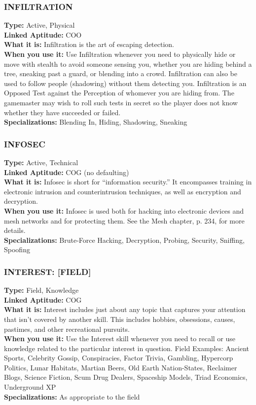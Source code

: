 \subsubsection{INFILTRATION} \textbf{Type:} Active, Physical \\ \textbf{Linked Aptitude:} COO \\ \textbf{What it is:} Infiltration is the art of escaping detection. \\ \textbf{When you use it:} Use Infiltration whenever you need to physically hide or move with stealth to avoid someone sensing you, whether you are hiding behind a tree, sneaking past a guard, or blending into a crowd. Infiltration can also be used to follow people (shadowing) without them detecting you. Infiltration is an Opposed Test against the Perception of whomever you are hiding from. The gamemaster may wish to roll such tests in secret so the player does not know whether they have succeeded or failed. \\ \textbf{Specializations:} Blending In, Hiding, Shadowing, Sneaking 

\subsubsection{INFOSEC} \textbf{Type:} Active, Technical \\ \textbf{Linked Aptitude:} COG (no defaulting) \\ \textbf{What it is:} Infosec is short for “information security.” It encompasses training in electronic intrusion and counterintrusion techniques, as well as encryption and decryption. \\ \textbf{When you use it:} Infosec is used both for hacking into electronic devices and mesh networks and for protecting them. See the Mesh chapter, p. 234, for more details. \\ \textbf{Specializations:} Brute-Force Hacking, Decryption, Probing, Security, Sniffing, Spoofing 

\subsubsection{INTEREST: [FIELD]} \textbf{Type:} Field, Knowledge \\ \textbf{Linked Aptitude:} COG \\ \textbf{What it is:} Interest includes just about any topic that captures your attention that isn’t covered by another skill. This includes hobbies, obsessions, causes, pastimes, and other recreational pursuits. \\ \textbf{When you use it:} Use the Interest skill whenever you need to recall or use knowledge related to the particular interest in question. Field Examples: Ancient Sports, Celebrity Gossip, Conspiracies, Factor Trivia, Gambling, Hypercorp Politics, Lunar Habitats, Martian Beers, Old Earth Nation-States, Reclaimer Blogs, Science Fiction, Scum Drug Dealers, Spaceship Models, Triad Economics, Underground XP \\ \textbf{Specializations:} As appropriate to the field 

